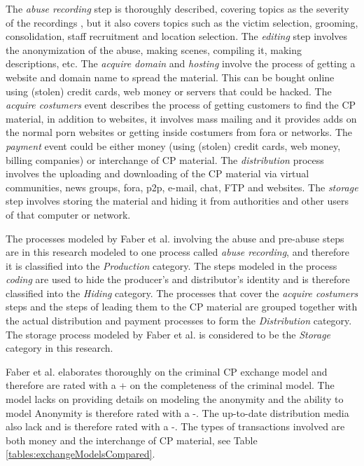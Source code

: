 \documentclass{sig-alternate-br}
\begin{document}
The \textit{abuse recording} step is thoroughly described, covering topics as the severity of the recordings \cite{quayle2002paedophiles}, but it also covers topics such as the victim selection, grooming, consolidation, staff recruitment and location selection. The \textit{editing} step involves the anonymization of the abuse, making scenes, compiling it, making descriptions, etc. The \textit{acquire domain} and \textit{hosting} involve the process of getting a website and domain name to spread the material. This can be bought online using (stolen) credit cards, web money or servers that could be hacked. The \textit{acquire costumers} event describes the process of getting customers to find the CP material, in addition to websites, it involves mass mailing and it provides adds on the normal porn websites or getting inside costumers from fora or networks. The \textit{payment} event could be either money (using (stolen) credit cards, web money, billing companies) or interchange of CP material. The \textit{distribution} process involves the uploading and downloading of the CP material via virtual communities, news groups, fora, p2p, e-mail, chat, FTP and websites. The \textit{storage} step involves storing the material and hiding it from authorities and other users of that computer or network.

The processes modeled by Faber et al. involving the abuse and pre-abuse steps are in this research modeled to one process called \textit{abuse recording}, and therefore it is classified into the \textit{Production} category. The steps modeled in the process \textit{coding} are used to hide the producer's and distributor's identity and is therefore classified into the \textit{Hiding} category. The processes that cover the \textit{acquire costumers} steps and the steps of leading them to the CP material are grouped together with the actual distribution and payment processes to form the \textit{Distribution} category. The storage process modeled by Faber et al. is considered to be the \textit{Storage} category in this research.

Faber et al. elaborates thoroughly on the criminal CP exchange model and therefore are rated with a + on the completeness of the criminal model. The model lacks on providing details on modeling the anonymity and the ability to model Anonymity is therefore rated with a -. The up-to-date distribution media also lack and is therefore rated with a -. The types of transactions involved are both money and the interchange of CP material, see Table \ref{tables:exchangeModelsCompared}.
\end{document}
